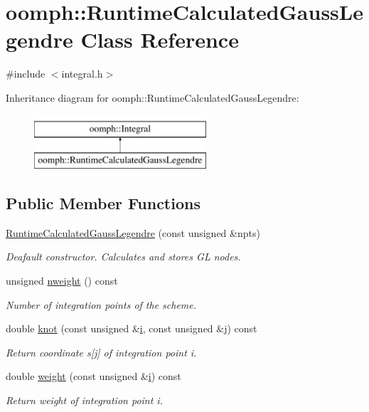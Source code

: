 \hypertarget{classoomph_1_1RuntimeCalculatedGaussLegendre}{}\section{oomph\+:\+:Runtime\+Calculated\+Gauss\+Legendre Class Reference}
\label{classoomph_1_1RuntimeCalculatedGaussLegendre}


{\ttfamily \#include $<$integral.\+h$>$}

Inheritance diagram for oomph\+:\+:Runtime\+Calculated\+Gauss\+Legendre\+:\begin{figure}[H]
\begin{center}
\leavevmode
\includegraphics[height=2.000000cm]{classoomph_1_1RuntimeCalculatedGaussLegendre}
\end{center}
\end{figure}
\subsection*{Public Member Functions}
\begin{DoxyCompactItemize}
\item 
\hyperlink{classoomph_1_1RuntimeCalculatedGaussLegendre_abf49398d75b7a03f1a079a375acf4683}{Runtime\+Calculated\+Gauss\+Legendre} (const unsigned \&npts)
\begin{DoxyCompactList}\small\item\em Deafault constructor. Calculates and stores GL nodes. \end{DoxyCompactList}\item 
unsigned \hyperlink{classoomph_1_1RuntimeCalculatedGaussLegendre_ae2f0ed3fd3e9e984988438156695f247}{nweight} () const
\begin{DoxyCompactList}\small\item\em Number of integration points of the scheme. \end{DoxyCompactList}\item 
double \hyperlink{classoomph_1_1RuntimeCalculatedGaussLegendre_ae477f9f837f36cc3d5456aa5f6de3f8e}{knot} (const unsigned \&\hyperlink{cfortran_8h_adb50e893b86b3e55e751a42eab3cba82}{i}, const unsigned \&j) const
\begin{DoxyCompactList}\small\item\em Return coordinate s\mbox{[}j\mbox{]} of integration point i. \end{DoxyCompactList}\item 
double \hyperlink{classoomph_1_1RuntimeCalculatedGaussLegendre_a9201c82ccd43b9f8dc0b95e55222595d}{weight} (const unsigned \&\hyperlink{cfortran_8h_adb50e893b86b3e55e751a42eab3cba82}{i}) const
\begin{DoxyCompactList}\small\item\em Return weight of integration point i. \end{DoxyCompactList}\end{DoxyCompactItemize}
